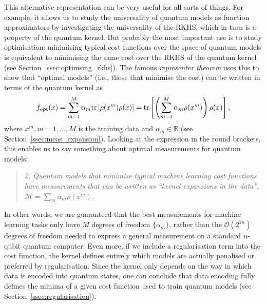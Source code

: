 \documentclass[aps, reprint, onecolumn, nofootinbib, longbibliography]{revtex4-2}
\newcommand{\tr}[1]{ \mathrm{tr}\left[#1\right] }
\newcommand{\meas}{\mathcal{M}}
\begin{document}
This alternative representation can be very useful for all sorts of things. For example, it allows us to study the universality of quantum models as function approximators by investigating the universality of the RKHS, which in turn is a property of the quantum kernel. But probably the most important use is to study  optimisation: minimising typical cost functions over the space of quantum models is equivalent to minimising the same cost over the RKHS of the quantum kernel (see Section~\ref{ssec:optimsing_rkhs}). The famous \textit{representer theorem} uses this to show  that ``optimal models'' (i.e., those that minimise the cost) can be written in terms of the quantum kernel as 
\begin{equation}\label{eq:preview_optimal}
f_{\rm opt}(x) = \sum_{m=1}^M \alpha_m \tr{\rho(x^m) \rho(x)} =  \tr{ \left(\sum_{m=1}^M \alpha_m\rho(x^m) \right) \rho(x)},
\end{equation} 
where $x^m, m=1,\dots,M$ is the training data and $\alpha_m \in \mathbb{R}$ (see Section~\ref{ssec:meas_expansion}). Looking at the expression in the round brackets, this enables us to say something about optimal measurements for quantum models:
\begin{quote}
    \textit{2. Quantum models that minimise typical machine learning cost functions have measurements that can be written as ``kernel expansions in the data'', $\meas = \sum_m \alpha_m \rho(x^m)$.   }
\end{quote}
In other words, we are guaranteed that the best measurements for machine learning tasks only have $M$ degrees of freedom $\{\alpha_m\}$, rather than the $\mathcal{O}(2^{2n})$ degrees of freedom needed to express a general measurement on a standard $n$-qubit quantum computer. Even more, if we include a regularisation term into the cost function, the kernel defines entirely which models are actually penalised or preferred by regularisation. Since the kernel only depends on the way in which data is encoded into quantum states, one can conclude that data encoding fully defines the minima of a given cost function used to train quantum models (see Section~\ref{ssec:regularisation}).
\end{document}
